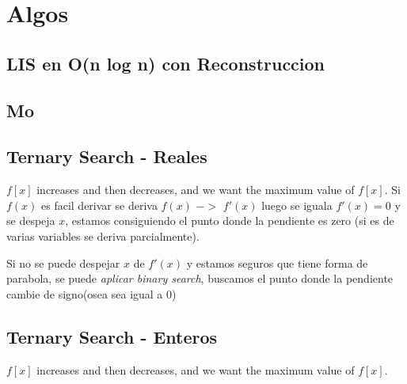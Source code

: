 

\section{Algos}%

\subsection{LIS en O(n log n) con Reconstruccion}

\subsection{Mo}

\subsection{Ternary Search - Reales}
$f[x]$ increases and then decreases, and we want the maximum value of $f[x]$.
Si $f(x)$ es facil derivar se deriva $f(x)$ $->$ $f'(x)$ luego se iguala $f'(x) = 0$ y se despeja $x$, estamos consiguiendo el punto donde la pendiente es zero (si es de varias variables se deriva parcialmente).

Si no se puede despejar $x$ de $f'(x)$ y estamos seguros que tiene forma de parabola, se puede \emph{aplicar binary search}, buscamos el punto donde la pendiente cambie de signo(osea sea igual a 0)
\subsection{Ternary Search - Enteros}
$f[x]$ increases and then decreases, and we want the maximum value of $f[x]$.



